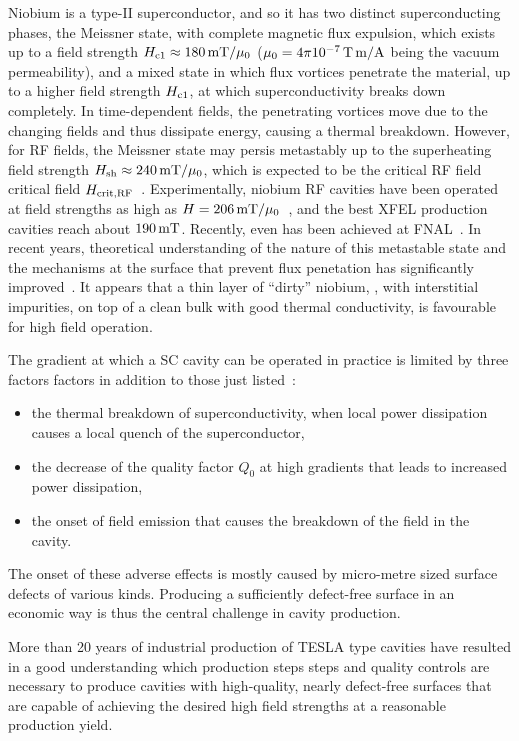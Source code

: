 Niobium is a type-II superconductor, and so it has two distinct superconducting phases, the Meissner state, with complete magnetic flux expulsion, which exists up to a field strength $H_{\mathrm{c1}} \approx 180\,{\mathrm{mT}}/\mu_0$ ($\mu_0 = 4\pi 10^{-7}\,{\mathrm{T\,m/A}}$ being the vacuum permeability), and a mixed state in which flux vortices penetrate the material, up to a higher field strength $H_{\mathrm{c1}}$, at which superconductivity breaks down completely.
In time-dependent fields, the penetrating vortices move due to the changing fields and thus dissipate energy, causing a thermal breakdown. 
However, for RF fields, the Meissner state may persis metastably up to the superheating field strength $H_{\mathrm{sh}} \approx 240\,{\mathrm{mT}}/\mu_0$, which is expected to be the critical RF field critical field $H_{\mathrm{crit,RF}}$~\cite{Padamsee:1998vf}.
Experimentally, niobium RF cavities have been operated at field strengths as high as $H=206\,{\mathrm{mT}}/\mu_0$~\cite{Eremeev:2007zza}, and the best XFEL production cavities reach about $190\,{\mathrm{mT}}$.
Recently, even  has been achieved at FNAL~\cite{Grassellino:2018tqg}.
In recent years, theoretical understanding of the nature of this metastable state and the mechanisms at the surface that prevent flux penetation has significantly improved~\cite{Gurevich:2017vnn,Kubo:2017cww}.
It appears that a thin layer of ``dirty'' niobium, \ie,  with interstitial impurities, on top of a clean bulk with good thermal conductivity, is favourable for high field operation.  

The gradient at which a SC cavity can be operated in practice is limited by three factors  factors in addition to those just listed~\cite{Padamsee:1998vf}:
\begin{itemize}
\item the thermal breakdown of superconductivity, when local power dissipation causes a local quench of the superconductor,
\item the decrease of the quality factor $Q_0$ at high gradients that leads to increased power dissipation,
\item the onset of field emission that causes the breakdown of the field in the cavity.
\end{itemize}
The onset of these adverse effects is mostly caused by micro-metre sized surface defects of various kinds. 
Producing a sufficiently defect-free surface in an economic way is thus the central challenge in cavity production.

More than 20 years of industrial production of TESLA type cavities have resulted in a good understanding which production steps steps and quality controls are necessary to produce cavities with high-quality, nearly defect-free surfaces that are capable of achieving the desired high field strengths at a reasonable production yield.


